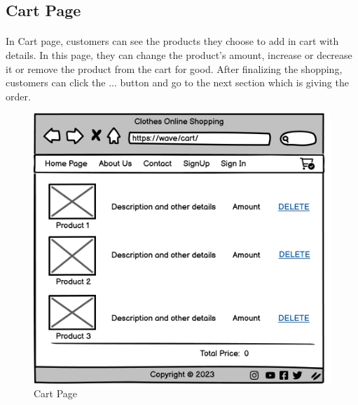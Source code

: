 \subsection{Cart Page}
\bigskip
\paragraph{}
In Cart page, customers can see the products they choose to add in cart with details. In this page, they can change the product's amount, increase or decrease it or remove the product from the cart for good. After finalizing the shopping, customers can click the ... button and go to the next section which is giving the order.
\bigskip
\bigskip
\bigskip
\begin{figure}[h]
\centerline{\includegraphics[scale=1.]{images/Cart.png}}
\caption{Cart Page}
\label{fig}
\end{figure}
